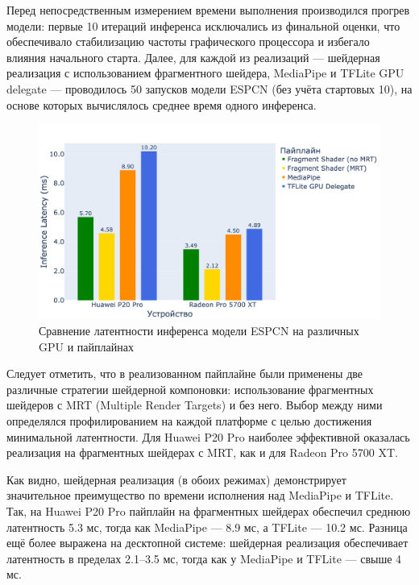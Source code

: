 \documentclass[a4paper,14pt]{extreport}
\begin{document}
            Перед непосредственным измерением времени выполнения производился прогрев модели: первые 10 итераций инференса исключались из финальной оценки, что обеспечивало стабилизацию частоты графического процессора и избегало влияния начального старта. Далее, для каждой из реализаций — шейдерная реализация с использованием фрагментного шейдера, MediaPipe и TFLite GPU delegate — проводилось 50 запусков модели ESPCN (без учёта стартовых 10), на основе которых вычислялось среднее время одного инференса.

            \begin{figure}[h]
                \vspace*{-15pt}
                \centering
                \includegraphics[width=0.98\linewidth]{images-tests/graphic.png}
                \caption{Сравнение латентности инференса модели ESPCN на различных GPU и пайплайнах}
                \label{ris:graphic}
                \vspace*{20pt}
            \end{figure}
            
            Следует отметить, что в реализованном пайплайне были применены две различные стратегии шейдерной компоновки: использование фрагментных шейдеров с MRT (Multiple Render Targets) и без него. Выбор между ними определялся профилированием на каждой платформе с целью достижения минимальной латентности. Для Huawei P20 Pro наиболее эффективной оказалась реализация на фрагментных шейдерах с MRT, как и для Radeon Pro 5700 XT.
            
            Как видно, шейдерная реализация (в обоих режимах) демонстрирует значительное преимущество по времени исполнения над MediaPipe и TFLite. Так, на Huawei P20 Pro пайплайн на фрагментных шейдерах обеспечил среднюю латентность 5.3 мс, тогда как MediaPipe — 8.9 мс, а TFLite — 10.2 мс. Разница ещё более выражена на десктопной системе: шейдерная реализация обеспечивает латентность в пределах 2.1–3.5 мс, тогда как у MediaPipe и TFLite — свыше 4 мс.
            
\end{document}
